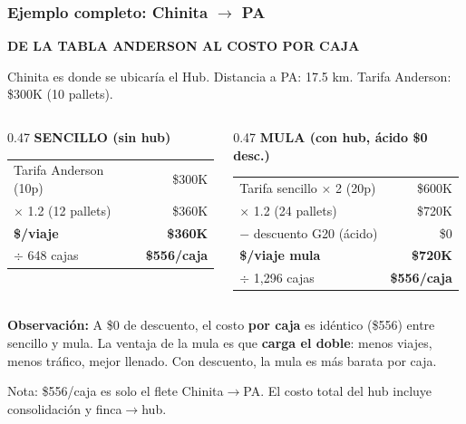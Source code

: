 \documentclass[aspectratio=169, 10pt]{beamer}
\newcommand{\tagline}[2]{{\scriptsize\color{#1}\textbf{\MakeUppercase{#2}}}}
\begin{document}
\begin{frame}
\frametitle{Ejemplo completo: Chinita $\rightarrow$ PA}
\tagline{azul}{De la Tabla Anderson al Costo por Caja}
\vspace{-2pt}

{\scriptsize Chinita es donde se ubicar\'ia el Hub. Distancia a PA: 17.5 km. Tarifa Anderson: \$300K (10 pallets).}

\vspace{4pt}
\begin{columns}[T]
\begin{column}{0.47\textwidth}
{\scriptsize\color{amarillo}\textbf{SENCILLO (sin hub)}}
\vspace{2pt}

\scriptsize
\renewcommand{\arraystretch}{1.05}
\begin{tabular}{l r}
    \toprule
    Tarifa Anderson (10p) & \$300K \\
    $\times$ 1.2 (12 pallets) & \$360K \\
    \midrule
    \textbf{\$/viaje} & \textbf{\$360K} \\
    $\div$ 648 cajas & \textbf{\$556/caja} \\
    \bottomrule
\end{tabular}
\end{column}

\begin{column}{0.47\textwidth}
{\scriptsize\color{naranja}\textbf{MULA (con hub, \'acido \$0 desc.)}}
\vspace{2pt}

\scriptsize
\renewcommand{\arraystretch}{1.05}
\begin{tabular}{l r}
    \toprule
    Tarifa sencillo $\times$ 2 (20p) & \$600K \\
    $\times$ 1.2 (24 pallets) & \$720K \\
    $-$ descuento G20 (\'acido) & \$0 \\
    \midrule
    \textbf{\$/viaje mula} & \textbf{\$720K} \\
    $\div$ 1,296 cajas & \textbf{\$556/caja} \\
    \bottomrule
\end{tabular}
\end{column}
\end{columns}

\vspace{6pt}
\colorbox{verdeclaro}{\parbox{\dimexpr\textwidth-12pt}{\scriptsize\strut
\textcolor{verde}{\textbf{Observaci\'on:}} A \$0 de descuento, el costo \textbf{por caja} es id\'entico (\$556)
entre sencillo y mula. La ventaja de la mula es que \textbf{carga el doble}:
menos viajes, menos tr\'afico, mejor llenado. Con descuento, la mula
es m\'as barata por caja.\strut}}

\vspace{2pt}
{\tiny\color{gris} Nota: \$556/caja es solo el flete Chinita$\rightarrow$PA. El costo total del hub incluye consolidaci\'on y finca$\rightarrow$hub.}
\end{frame}
\end{document}
